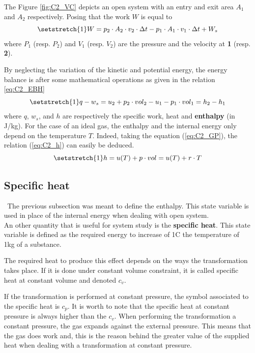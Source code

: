 The Figure \ref{fig:C2_VC} depicts an open system with an entry and exit area $A_1$ and $A_2$ respectively. Posing that the work $W$ is equal to 
\begin{equation}
\setstretch{1}
W = p_2\cdot A_2\cdot v_2\cdot \Delta t - p_1\cdot A_1\cdot v_1\cdot \Delta t + W_s
\end{equation}      
where $P_1$ (resp. $P_2$) and $V_1$ (resp. $V_2$) are the pressure and the velocity at \textbf{1} (resp. \textbf{2}).

By neglecting the variation of the kinetic and potential energy, the energy balance is after some mathematical operations as given in the relation \ref{eq:C2_EBH}
\begin{equation}
\setstretch{1}
q - w_s = u_2 +p_2\cdot vol_2 - u_1 - p_1\cdot vol_1 = h_2 - h_1\label{eq:C2_EBH}
\end{equation}
where $q$, $w_s$, and $h$ are respectively the specific work, heat and \textbf{enthalpy} (in J/kg).  
For the case of an ideal gas, the enthalpy and the internal energy only depend on the temperature $T$. Indeed, taking the equation (\ref{eq:C2_GP}), the relation (\ref{eq:C2_h}) can easily be deduced.
\begin{equation}
\setstretch{1}
h = u(T) + p\cdot vol = u(T) + r\cdot T \label{eq:C2_h}
\end{equation}
\subsection{Specific heat}
\quad\, The previous subsection was meant to define the enthalpy. This state variable is used in place of the internal energy when dealing with open system.\\

An other quantity that is useful for system study is the \textbf{specific heat}. This state variable is defined as the required energy to increase of 1\degree C the temperature of 1kg of a substance. 
 
The required heat to produce this effect depends on the ways the transformation takes place. 
If it is done under constant volume constraint, it is called specific heat at constant volume and denoted $c_v$. 

If the transformation is performed at constant pressure, the symbol associated to the specific heat is $c_p$.
It is worth to note that the specific heat at constant pressure is always higher than the $c_v$. When performing the transformation a constant pressure, the gas expands against the external pressure. This means that the gas does work and, this is the reason behind the greater value of the supplied heat when dealing with a transformation at constant pressure. 

